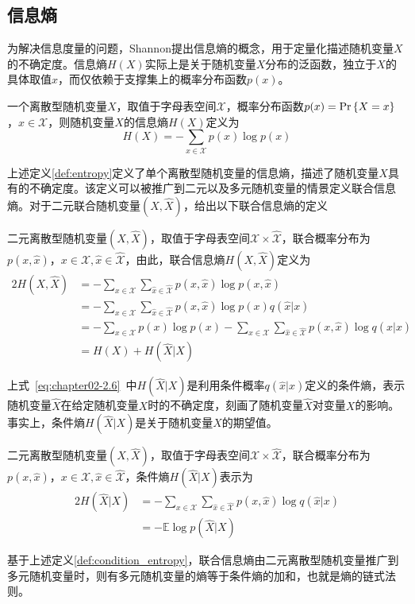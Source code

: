 \subsection{信息熵}
为解决信息度量的问题，Shannon提出信息熵的概念，用于定量化描述随机变量$X$的不确定度。信息熵$H(X)$实际上是关于随机变量$X$分布的泛函数，独立于$X$的具体取值$x$，而仅依赖于支撑集上的概率分布函数$p(x)$\cite{cover2006elements}。
\begin{definition}\label{def:entropy}一个离散型随机变量$X$，取值于字母表空间$\mathcal{X}$，概率分布函数$p(x)={\rm Pr}\left\{X=x\right\}$，$x \in \mathcal{X}$，则随机变量$X$的信息熵$H(X)$定义为
\begin{equation}
H(X)=-\sum_{x\in \mathcal{X}}p(x)\log p(x)
\end{equation}
\end{definition}
上述定义\ref{def:entropy}定义了单个离散型随机变量的信息熵，描述了随机变量$X$具有的不确定度。该定义可以被推广到二元以及多元随机变量的情景定义联合信息熵。对于二元联合随机变量$(X,\hat{X})$，给出以下联合信息熵的定义
\begin{definition}
	二元离散型随机变量$(X,\hat{X})$，取值于字母表空间$\mathcal{X}\times \hat{\mathcal{X}}$，联合概率分布为$p(x,\hat{x})$，$x \in \mathcal{X},\hat{x} \in \hat{\mathcal{X}}$，由此，联合信息熵$H(X,\hat{X})$定义为
		\begin{alignat}{2}
		H(X,\hat{X})
		& 	=-\sum_{x\in \mathcal{X}}\sum_{\hat{x}\in \hat{\mathcal{X}}}p(x,\hat{x})\log p(x,\hat{x})\\
		& 	= -\sum_{x\in \mathcal{X}}\sum_{\hat{x}\in \hat{\mathcal{X}}}p(x,\hat{x}) \log p(x) q(\hat{x}|x)\\
		& = - \sum_{x \in \mathcal{X}}p(x) \log p(x)- \sum_{x\in \mathcal{X}}\sum_{\hat{x}\in \hat{\mathcal{X}}}p(x,\hat{x}) \log  q(\hat{x}|x)\\
		&   = H(X)+H(\hat{X}|X)\label{eq:chapter02-2.6}
	\end{alignat}
\end{definition}
上式~\ref{eq:chapter02-2.6}~中$H(\hat{X}|X)$是利用条件概率$q(\hat{x}|x)$定义的条件熵，表示随机变量$\hat{X}$在给定随机变量$X$时的不确定度，刻画了随机变量$\hat{X}$对变量$X$的影响。事实上，条件熵$H(\hat{X}|X)$是关于随机变量$X$的期望值。
\begin{definition}\label{def:condition_entropy}
		二元离散型随机变量$(X,\hat{X})$，取值于字母表空间$\mathcal{X}\times \hat{\mathcal{X}}$，联合概率分布为$p(x,\hat{x})$，$x \in \mathcal{X},\hat{x} \in \hat{\mathcal{X}}$，条件熵$H(\hat{X}|X)$表示为
 \begin{alignat}{2}
   H(\hat{X}|X)
   & = -\sum_{x \in \mathcal{X}}\sum_{\hat{x}\in \hat{\mathcal{X}}}p(x,\hat{x})\log q(\hat{x}|x)\\
   & = -\mathbb{E} \log p(\hat{X}|X)
   \end{alignat}

\end{definition}
基于上述定义\ref{def:condition_entropy}，联合信息熵由二元离散型随机变量推广到多元随机变量时，则有多元随机变量的熵等于条件熵的加和，也就是熵的链式法则。%

